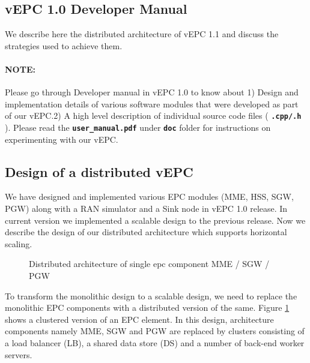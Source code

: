 \documentclass[hidelinks]{report}
\newcommand{\cf}[1] {
	\textbf{\texttt{#1}}
}
\begin{document}

\begin{center}
\section*{vEPC 1.0 Developer Manual}
\end{center}
We describe here the distributed architecture of vEPC 1.1 and discuss the strategies used to achieve them.\\

\paragraph*{NOTE:}

 Please go through Developer manual in vEPC 1.0 to know about 1) Design and implementation details of various software modules that were developed as part of our vEPC.2) A high level description of individual source code files (\cf{.cpp/.h}). Please read the \cf{user\_manual.pdf} under \cf{doc} folder for instructions on experimenting with our vEPC.


\begin{center}

\subsection*{ Design of a distributed vEPC}

\end{center}

We have designed and implemented various EPC modules (MME, HSS, SGW, PGW) along with a RAN simulator and a Sink node in vEPC 1.0 release. In current version we implemented a scalable design to the previous release. Now we describe the design of our distributed architecture which supports horizontal scaling.



\begin{figure}[H]
\centering
{}
\caption{Distributed architecture of single epc component
MME / SGW / PGW}
\label{fig:singlel}
\end{figure}
To transform the monolithic design to a scalable design, we need to replace the monolithic EPC components with a distributed  version of the same. Figure \ref{fig:singlel} shows a clustered version of an EPC element. In this design, architecture components namely MME, SGW and PGW are replaced by clusters consisting of a load balancer (LB), a shared data store (DS) and a number of back-end worker servers. 
\end{document}
